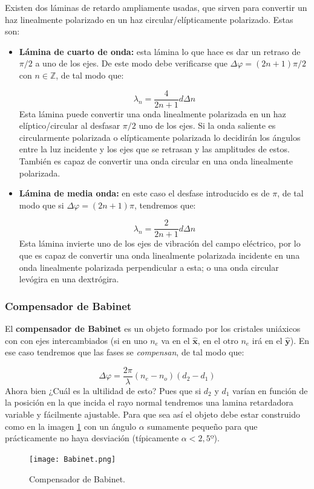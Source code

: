 \documentclass[12pt,a4paper]{article}
\newcommand{\hnx}{\hat{\mathbf{x}}}
\newcommand{\hny}{\hat{\mathbf{y}}}
\numberwithin{equation}{section}
\numberwithin{figure}{section}
\begin{document}
Existen dos láminas de retardo ampliamente usadas, que sirven para convertir un haz linealmente polarizado en un haz circular/elípticamente polarizado. Estas son:

\begin{itemize}
\item  \textbf{Lámina de cuarto de onda:} esta lámina lo que hace es dar un retraso de $\pi/2$ a uno de los ejes. De este modo debe verificarse que $\Delta \varphi = (2n+1) \pi / 2$ con $n\in \mathbb{Z}$, de tal modo que:

\begin{equation}
\lambda_n = \dfrac{4}{2n+1} d \Delta n 
\end{equation}
Esta lámina puede convertir una onda linealmente polarizada en un haz elíptico/circular al desfasar $\pi/2$ uno de los ejes. Si la onda saliente es circularmente polarizada o elípticamente polarizada lo decidirán los ángulos entre la luz incidente y los ejes que se retrasan y las amplitudes de estos. También es capaz de convertir una onda circular en una onda linealmente polarizada.

\item \textbf{Lámina de media onda:} en este caso el desfase introducido es de $\pi$, de tal modo que si $\Delta \varphi  = (2n+1) \pi$, tendremos que:


\begin{equation}
\lambda_n = \dfrac{2}{2n+1} d \Delta n 
\end{equation}
Esta lámina invierte uno de los ejes de vibración del campo eléctrico, por lo que es capaz de convertir una onda linealmente polarizada incidente en una onda linealmente polarizada perpendicular a esta; o una onda circular levógira en una dextrógira. 
\end{itemize}

\subsubsection{Compensador de Babinet}

El \textbf{compensador de Babinet} es un objeto formado por los cristales uniáxicos con con ejes intercambiados (si en uno $n_e$ va en el $\hnx$, en el otro $n_e$ irá en el $\hny$). En ese caso tendremos que las fases se \textit{compensan}, de tal modo que:


\begin{equation}
\Delta \varphi = \dfrac{2 \pi}{\lambda} (n_e - n_o ) (d_2-d_1)
\end{equation}
Ahora bien ¿Cuál es la ultilidad de esto? Pues que si $d_2$ y $d_1$ varían en función de la posición en la que incida el rayo normal tendremos una lamina retardadora variable y fácilmente ajustable. Para que sea así el objeto debe estar construido como en la imagen \ref{Fig:10.3.1.01} con un ángulo $\alpha$ sumamente pequeño para que prácticamente no haya desviación (típicamente $\alpha < 2,5º$). 

\begin{figure}[h!] \centering
\texttt{[image: Babinet.png]}
\caption{Compensador de Babinet.}
\label{Fig:10.3.1.01}
\end{figure}
\end{document}
